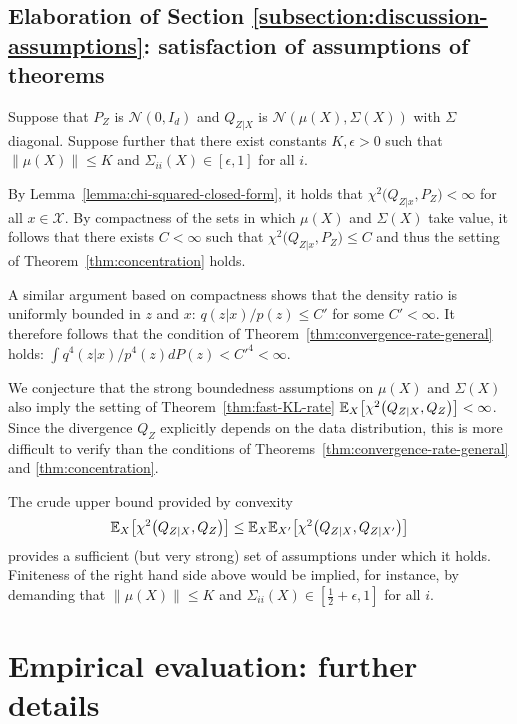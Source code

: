 \subsection{Elaboration of Section \ref{subsection:discussion-assumptions}: satisfaction of assumptions of theorems}\label{appendix:discussion-constraints}

Suppose that ${P_Z}$ is  ${\mathcal{N}\left(0, I_d\right)}$ and ${Q_{Z|X}}$ is  ${\mathcal{N}\left( \mu(X), \Sigma(X)\right)}$ with $\Sigma$ diagonal. 
Suppose further that there exist constants $K, \epsilon > 0$ such that ${\| \mu(X)\| \leq K}$ and ${\Sigma_{ii}(X) \in [\epsilon, 1]}$ for all $i$.

By Lemma~\ref{lemma:chi-squared-closed-form}, it holds that $\chi^2\bigl( Q_{Z|x}, P_Z\bigr) < \infty$ for all $x\in\mathcal{X}$. 
By compactness of the sets in which $\mu(X)$ and $\Sigma(X)$ take value, it follows that there exists $C<\infty$ such that $\chi^2\bigl( Q_{Z|x}, P_Z\bigr) \leq C$ and thus the setting of Theorem~\ref{thm:concentration} holds.

A similar argument based on compactness shows that the density ratio is uniformly bounded in $z$ and $x$: $q(z|x)/p(z) \leq C'$ for some $C'<\infty$. 
It therefore follows that the condition of Theorem~\ref{thm:convergence-rate-general} holds: $\int q^4(z|x)/p^4(z) dP(z) < {C'}^4 < \infty$.

We conjecture that the strong boundedness assumptions on $\mu(X)$ and $\Sigma(X)$ also imply the setting of Theorem~\ref{thm:fast-KL-rate} $\mathbb{E}_{X}\bigl[\chi^2\bigl(Q_{Z|X}, Q_Z\bigr)\bigr] < \infty$.
Since the divergence $Q_Z$ explicitly depends on the data distribution, this is more difficult to verify than the conditions of Theorems~\ref{thm:convergence-rate-general} and \ref{thm:concentration}.

The crude upper bound provided by convexity
\[
\mathbb{E}_{X}\bigl[\chi^2\bigl(Q_{Z|X}, Q_Z\bigr)\bigr] \leq  \mathbb{E}_{X}\mathbb{E}_{X'}\bigl[\chi^2\bigl(Q_{Z|X}, Q_{Z|X'}\bigr)\bigr]
\]
provides a sufficient (but very strong) set of assumptions under which it holds. 
Finiteness of the right hand side above would be implied, for instance, by demanding that ${\| \mu(X)\| \leq K}$ and ${\Sigma_{ii}(X) \in [\frac{1}{2}+\epsilon, 1]}$ for all $i$.


\section{Empirical evaluation: further details}\label{appendix:empirical-evaluation-details}

